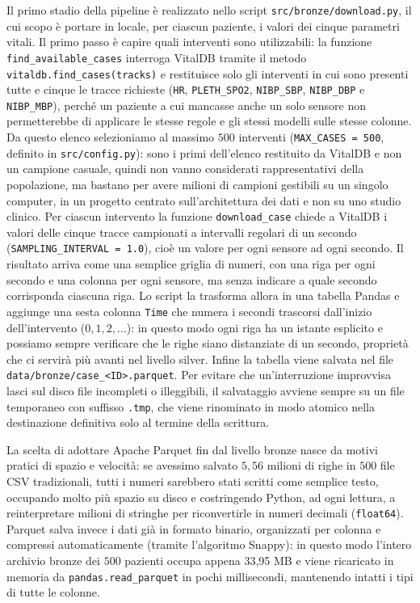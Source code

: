 Il primo stadio della pipeline \`e realizzato nello script \texttt{src/bronze/\allowbreak download.py}, il cui scopo \`e portare in locale, per ciascun paziente, i valori dei cinque parametri vitali. Il primo passo \`e capire quali interventi sono utilizzabili: la funzione \texttt{find\_\allowbreak available\_\allowbreak cases} interroga VitalDB tramite il metodo \texttt{vitaldb.\allowbreak find\_\allowbreak cases(tracks)} e restituisce solo gli interventi in cui sono presenti tutte e cinque le tracce richieste (\texttt{HR}, \texttt{PLETH\_SPO2}, \texttt{NIBP\_SBP}, \texttt{NIBP\_DBP} e \texttt{NIBP\_MBP}), perch\'e un paziente a cui mancasse anche un solo sensore non permetterebbe di applicare le stesse regole e gli stessi modelli sulle stesse colonne. Da questo elenco selezioniamo al massimo $500$ interventi (\texttt{MAX\_CASES = 500}, definito in \texttt{src/config.py}): sono i primi dell'elenco restituito da VitalDB e non un campione casuale, quindi non vanno considerati rappresentativi della popolazione, ma bastano per avere milioni di campioni gestibili su un singolo computer, in un progetto centrato sull'architettura dei dati e non su uno studio clinico. Per ciascun intervento la funzione \texttt{download\_case} chiede a VitalDB i valori delle cinque tracce campionati a intervalli regolari di un secondo (\texttt{SAMPLING\_INTERVAL = 1.0}), cio\`e un valore per ogni sensore ad ogni secondo. Il risultato arriva come una semplice griglia di numeri, con una riga per ogni secondo e una colonna per ogni sensore, ma senza indicare a quale secondo corrisponda ciascuna riga. Lo script la trasforma allora in una tabella Pandas e aggiunge una sesta colonna \texttt{Time} che numera i secondi trascorsi dall'inizio dell'intervento ($0, 1, 2, \dots$): in questo modo ogni riga ha un istante esplicito e possiamo sempre verificare che le righe siano distanziate di un secondo, propriet\`a che ci servir\`a pi\`u avanti nel livello silver. Infine la tabella viene salvata nel file \texttt{data/bronze/\allowbreak case\_<ID>.parquet}. Per evitare che un'interruzione improvvisa lasci sul disco file incompleti o illeggibili, il salvataggio avviene sempre su un file temporaneo con suffisso \texttt{.tmp}, che viene rinominato in modo atomico nella destinazione definitiva solo al termine della scrittura.

La scelta di adottare Apache Parquet fin dal livello bronze nasce da motivi pratici di spazio e velocit\`a: se avessimo salvato $5,56$ milioni di righe in $500$ file CSV tradizionali, tutti i numeri sarebbero stati scritti come semplice testo, occupando molto pi\`u spazio su disco e costringendo Python, ad ogni lettura, a reinterpretare milioni di stringhe per riconvertirle in numeri decimali (\texttt{float64}). Parquet salva invece i dati gi\`a in formato binario, organizzati per colonna e compressi automaticamente (tramite l'algoritmo Snappy): in questo modo l'intero archivio bronze dei $500$ pazienti occupa appena 33,95 MB e viene ricaricato in memoria da \texttt{pandas.\allowbreak read\_\allowbreak parquet} in pochi millisecondi, mantenendo intatti i tipi di tutte le colonne.

